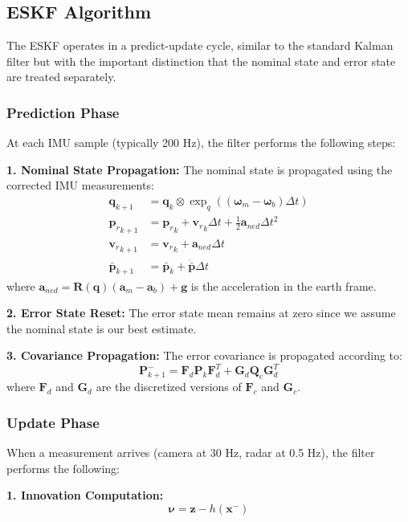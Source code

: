 \documentclass[11pt,a4paper]{article}
\newcommand{\quat}{\mathbf{q}}
\newcommand{\pr}{\mathbf{p}_r}
\newcommand{\vr}{\mathbf{v}_r}
\newcommand{\pbar}{\bar{\mathbf{p}}}
\newcommand{\bgyr}{\bm{\omega}_b}
\newcommand{\bacc}{\mathbf{a}_b}
\newcommand{\R}{\mathbf{R}}
\begin{document}
\subsection{ESKF Algorithm}

The ESKF operates in a predict-update cycle, similar to the standard Kalman filter but with the important distinction that the nominal state and error state are treated separately.

\subsubsection{Prediction Phase}
At each IMU sample (typically 200 Hz), the filter performs the following steps:

\textbf{1. Nominal State Propagation:} The nominal state is propagated using the corrected IMU measurements:
\begin{align}
    \quat_{k+1} &= \quat_k \otimes \exp_q\left((\bm{\omega}_m - \bgyr) \Delta t\right) \\
    {\pr}_{k+1} &= {\pr}_k + {\vr}_k \Delta t + \frac{1}{2}\mathbf{a}_{ned} \Delta t^2 \\
    {\vr}_{k+1} &= {\vr}_k + \mathbf{a}_{ned} \Delta t \\
    {\pbar}_{k+1} &= {\pbar}_k + \dot{\pbar} \Delta t
\end{align}
where $\mathbf{a}_{ned} = \R(\quat)(\mathbf{a}_m - \bacc) + \mathbf{g}$ is the acceleration in the earth frame.

\textbf{2. Error State Reset:} The error state mean remains at zero since we assume the nominal state is our best estimate.

\textbf{3. Covariance Propagation:} The error covariance is propagated according to:
\begin{equation}
    \mathbf{P}_{k+1}^- = \mathbf{F}_d \mathbf{P}_k \mathbf{F}_d^T + \mathbf{G}_d \mathbf{Q}_c \mathbf{G}_d^T
\end{equation}
where $\mathbf{F}_d$ and $\mathbf{G}_d$ are the discretized versions of $\mathbf{F}_c$ and $\mathbf{G}_c$.

\subsubsection{Update Phase}
When a measurement arrives (camera at 30 Hz, radar at 0.5 Hz), the filter performs the following:

\textbf{1. Innovation Computation:}
\begin{equation}
    \bm{\nu} = \mathbf{z} - h(\mathbf{x}^-)
\end{equation}
\end{document}
